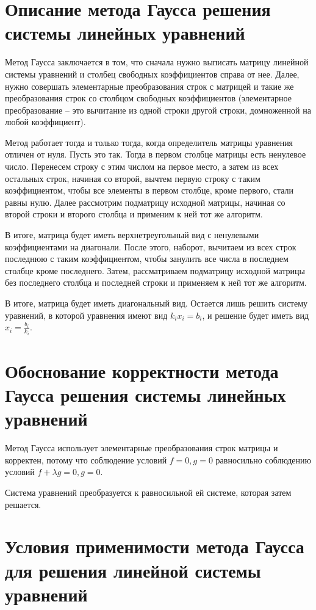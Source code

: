 \documentclass[12pt,reqno]{amsart}
\theoremstyle{definition}
\theoremstyle{remark}
\newcommand{\lfrac} [2] {\displaystyle \frac{#1}{#2}}
\begin{document}
\section*{Описание метода Гаусса решения системы линейных уравнений}
Метод Гаусса заключается в том, что сначала нужно выписать матрицу линейной системы уравнений и столбец свободных коэффициентов справа от нее. Далее, нужно совершать элементарные преобразования строк с матрицей и такие же преобразования строк со столбцом свободных коэффициентов (элементарное преобразование -- это вычитание из одной строки другой строки, домноженной на любой коэффициент).

Метод работает тогда и только тогда, когда определитель матрицы уравнения отличен от нуля. Пусть это так. Тогда в первом столбце матрицы есть ненулевое число. Перенесем строку с этим числом на первое место, а затем из всех остальных строк, начиная со второй, вычтем первую строку с таким коэффициентом, чтобы все элементы в первом столбце, кроме первого, стали равны нулю. Далее рассмотрим подматрицу исходной матрицы, начиная со второй строки и второго столбца и применим к ней тот же алгоритм.

В итоге, матрица будет иметь верхнетреугольный вид с ненулевыми коэффициентами на диагонали. После этого, наборот, вычитаем из всех строк последнюю с таким коэффициентом, чтобы занулить все числа в последнем столбце кроме последнего. Затем, рассматриваем подматрицу исходной матрицы без последнего столбца и последней строки и применяем к ней тот же алгоритм.

В итоге, матрица будет иметь диагональный вид. Остается лишь решить систему уравнений, в которой уравнения имеют вид $k_i x_i = b_i$, и решение будет иметь вид $x_i = \lfrac{b_i}{k_i}$.

\section*{Обоснование корректности метода Гаусса решения системы линейных уравнений}

Метод Гаусса использует элементарные преобразования строк матрицы и корректен, потому что соблюдение условий $f = 0, g = 0$ равносильно соблюдению условий $f + \lambda g = 0, g = 0$.

Система уравнений преобразуется к равносильной ей системе, которая затем решается.

\section*{Условия применимости метода Гаусса для решения линейной системы уравнений}
\end{document}
